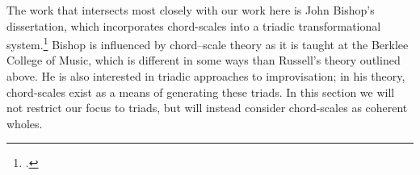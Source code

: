 The work that intersects most closely with our work here is John Bishop's
dissertation, which incorporates chord-scales into a triadic transformational
system.\footcite{bishop:2012} Bishop is influenced by chord--scale theory as
it is taught at the Berklee College of Music, which is different in some ways
than Russell's theory outlined above. He is also interested in
triadic approaches to improvisation; in his theory, chord-scales exist as a
means of generating these triads. In this section we will not
restrict our focus to triads, but will instead consider chord-scales as
coherent wholes.

